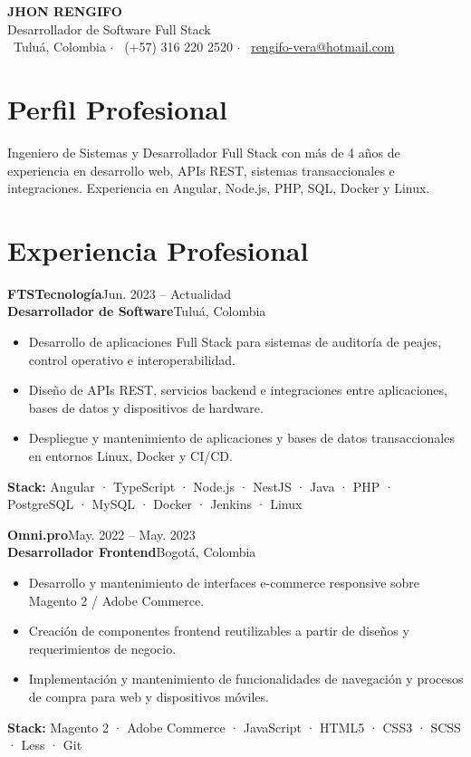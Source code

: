 \documentclass[10pt,a4paper]{article}
\begin{document}
\begin{center}
{\fontsize{24}{26}\selectfont\textbf{\color{primary}JHON RENGIFO}}\\
\vspace{2pt}
{\large Desarrollador de Software Full Stack}\\
\vspace{5pt}
\small
\faMapMarker*\ Tuluá, Colombia
\quad $\cdot$ \quad
\faPhone\ (+57) 316 220 2520
\quad $\cdot$ \quad
\faEnvelope\ \href{mailto:rengifo-vera@hotmail.com}{rengifo-vera@hotmail.com}
\end{center}

\section{Perfil Profesional}
Ingeniero de Sistemas y Desarrollador Full Stack con más de 4 años de experiencia en desarrollo web, APIs REST, sistemas transaccionales e integraciones. Experiencia en Angular, Node.js, PHP, SQL, Docker y Linux.

\section{Experiencia Profesional}
\textbf{\large FTSTecnología}\hfill{\small\color{muted}Jun. 2023 -- Actualidad}\\
\textbf{Desarrollador de Software}\hfill{\small\color{muted}Tuluá, Colombia}
\vspace{1pt}
\begin{itemize}
\item Desarrollo de aplicaciones Full Stack para sistemas de auditoría de peajes, control operativo e interoperabilidad.
\item Diseño de APIs REST, servicios backend e integraciones entre aplicaciones, bases de datos y dispositivos de hardware.
\item Despliegue y mantenimiento de aplicaciones y bases de datos transaccionales en entornos Linux, Docker y CI/CD.
\end{itemize}
{\small\textbf{Stack:} Angular · TypeScript · Node.js · NestJS · Java · PHP · PostgreSQL · MySQL · Docker · Jenkins · Linux}

\vspace{4pt}
\textbf{\large Omni.pro}\hfill{\small\color{muted}May. 2022 -- May. 2023}\\
\textbf{Desarrollador Frontend}\hfill{\small\color{muted}Bogotá, Colombia}
\vspace{1pt}
\begin{itemize}
\item Desarrollo y mantenimiento de interfaces e-commerce responsive sobre Magento 2 / Adobe Commerce.
\item Creación de componentes frontend reutilizables a partir de diseños y requerimientos de negocio.
\item Implementación y mantenimiento de funcionalidades de navegación y procesos de compra para web y dispositivos móviles.
\end{itemize}
{\small\textbf{Stack:} Magento 2 · Adobe Commerce · JavaScript · HTML5 · CSS3 · SCSS · Less · Git}
\end{document}
